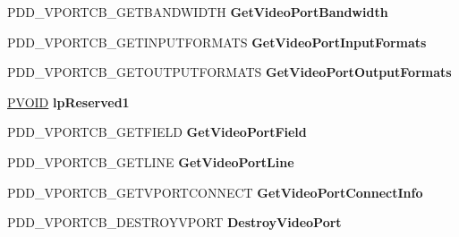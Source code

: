 \begin{DoxyCompactItemize}
P\+D\+D\+\_\+\+V\+P\+O\+R\+T\+C\+B\+\_\+\+G\+E\+T\+B\+A\+N\+D\+W\+I\+D\+TH {\bfseries Get\+Video\+Port\+Bandwidth}
\item 
\mbox{\label{struct_d_d___v_i_d_e_o_p_o_r_t_c_a_l_l_b_a_c_k_s_a842221ad28b29f767e1268383e5bb401}} 
P\+D\+D\+\_\+\+V\+P\+O\+R\+T\+C\+B\+\_\+\+G\+E\+T\+I\+N\+P\+U\+T\+F\+O\+R\+M\+A\+TS {\bfseries Get\+Video\+Port\+Input\+Formats}
\item 
\mbox{\label{struct_d_d___v_i_d_e_o_p_o_r_t_c_a_l_l_b_a_c_k_s_a31a382d513ad7e7e9dee316393014754}} 
P\+D\+D\+\_\+\+V\+P\+O\+R\+T\+C\+B\+\_\+\+G\+E\+T\+O\+U\+T\+P\+U\+T\+F\+O\+R\+M\+A\+TS {\bfseries Get\+Video\+Port\+Output\+Formats}
\item 
\mbox{\label{struct_d_d___v_i_d_e_o_p_o_r_t_c_a_l_l_b_a_c_k_s_a4cbbbd65cad60c318fd19b1f48766705}} 
\hyperlink{interfacevoid}{P\+V\+O\+ID} {\bfseries lp\+Reserved1}
\item 
\mbox{\label{struct_d_d___v_i_d_e_o_p_o_r_t_c_a_l_l_b_a_c_k_s_a50d60346b7e123cfa48fa759b04afed1}} 
P\+D\+D\+\_\+\+V\+P\+O\+R\+T\+C\+B\+\_\+\+G\+E\+T\+F\+I\+E\+LD {\bfseries Get\+Video\+Port\+Field}
\item 
\mbox{\label{struct_d_d___v_i_d_e_o_p_o_r_t_c_a_l_l_b_a_c_k_s_a4bd6a3a302d2ba8dfa5a0545145ac0ca}} 
P\+D\+D\+\_\+\+V\+P\+O\+R\+T\+C\+B\+\_\+\+G\+E\+T\+L\+I\+NE {\bfseries Get\+Video\+Port\+Line}
\item 
\mbox{\label{struct_d_d___v_i_d_e_o_p_o_r_t_c_a_l_l_b_a_c_k_s_a86e81d032020f963b19bb49c37cfffb0}} 
P\+D\+D\+\_\+\+V\+P\+O\+R\+T\+C\+B\+\_\+\+G\+E\+T\+V\+P\+O\+R\+T\+C\+O\+N\+N\+E\+CT {\bfseries Get\+Video\+Port\+Connect\+Info}
\item 
\mbox{\label{struct_d_d___v_i_d_e_o_p_o_r_t_c_a_l_l_b_a_c_k_s_a13384243aa820ea09d73cbba1ad7a8eb}} 
P\+D\+D\+\_\+\+V\+P\+O\+R\+T\+C\+B\+\_\+\+D\+E\+S\+T\+R\+O\+Y\+V\+P\+O\+RT {\bfseries Destroy\+Video\+Port}
\item 

\end{DoxyCompactItemize}
